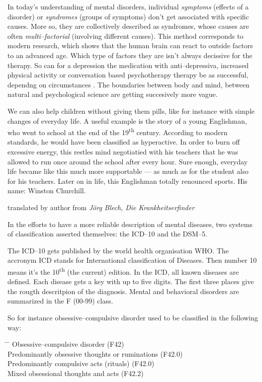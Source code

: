 \documentclass[../main.tex]{subfiles}
\begin{document}
\vspace{5mm}

In today's understanding of mental disorders, individual \emph{symptoms} (effects of a disorder)
or \emph{syndromes} (groups of symptoms) don't get associated with specific causes.
More so, they are collectively described as syndromes, whose causes are often \emph{multi--factorial} (involving different causes).
This method corresponds to modern research, which shows that the human brain can react to outside factors to an advanced age.
Which type of factors they are isn't always decissive for the therapy.
So can for a depression the medication with anti--depressiva,
increased physical activity or conversation based psychotherapy therapy be as successful, dependng on circumstances .
The boundaries between body and mind, between natural  and psychological science are getting succesively more vague.

\setlength{\epigraphwidth}{0.8\textwidth}
\epigraph{We can also help children without giving them pills, like for instance with simple changes of everyday life.
  A useful example is the story of a young Englishman, who went to school at the end of the 19\textsuperscript{th} century.
  According to modern standards, he would have been classified as hyperactive.
  In order to burn off excessive energy, this restles mind negotiatied with his teachers that he was allowed to run once around the
  school after every hour.
  Sure enough, everyday life became like this much more supportable --- as much as for the student also for his teachers.
  Later on in life, this Englishman totally renounced sports.
  His name: Winston Churchill.}{translated by author from \textit{J\"org Blech, Die Krankheitserfinder}}
\setlength{\epigraphwidth}{0.4\textwidth}


In the efforts to have a more reliable description of mental diseases,
two systems of classification asserted themselves: the ICD--10 and the DSM--5.


The ICD--10 gets published by the world health organisation WHO.
The accronym ICD stands for International classification of Diseases.
Then number 10 means it's the 10\textsuperscript{th} (the current) edition.
In the ICD, all known diseases are defined.
Each disease gets a key with up to five digits.
The first three places give the rougth descritpion of the diagnosis.
Mental and behavioral disorders are summarized in the F (00-99) class.

So for instance obsessive--compulsive disorder used to be classified in the following way:

\begin{tabbing}
  \hspace{2cm} \= \hspace{1cm} \= \kill
  \>Obsessive--compulsive disorder (F42) \\
  \> \> Predominantly obsessive thoughts or ruminations (F42.0)\\
  \> \> Predominantly compulsive acts (rituals) (F42.0) \\
  \> \> Mixed obsessional thoughts and acts (F42.2) \\
  \end{tabbing}
\end{document}
